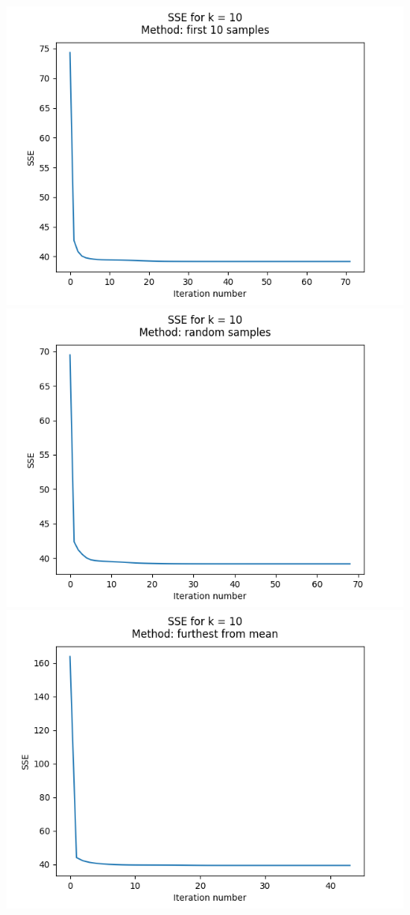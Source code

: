 \documentclass{article}
\begin{document}
\newpage
\begin{center}
    \includegraphics[trim=3cm 0 0 0, scale=0.5]{images/task1_8_0.png}
    \includegraphics[trim=0 0 3cm 0, scale=0.5]{images/task1_8_1.png}
    \vspace{0.5cm}
    \includegraphics[trim=3cm 0 0 0, scale=0.5]{images/task1_8_2.png}

\end{center}
\end{document}
